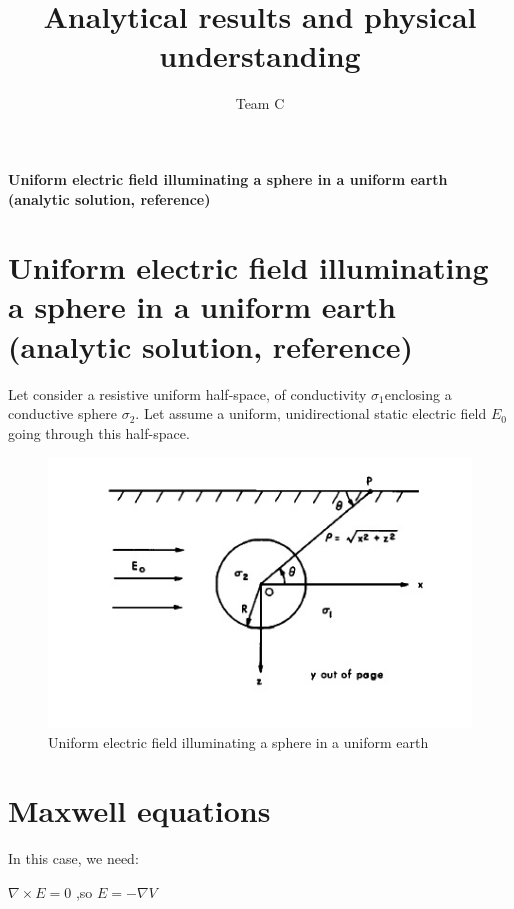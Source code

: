 \documentclass[11pt,letterpaper,leqno]{amsart}
\title{Analytical results and physical understanding}
\author{Team C}
\numberwithin{equation}{section}
\begin{document}
\maketitle
\thispagestyle{empty}



\Large
\textbf{Uniform electric field illuminating a sphere in a uniform earth (analytic solution, reference)}

\normalsize

\vspace{0.4cm}


\section{Uniform electric field illuminating a sphere in a uniform earth (analytic solution, reference)}



Let consider a  resistive uniform half-space, of conductivity $\sigma_1$enclosing a conductive sphere $\sigma_2$. Let assume a uniform, unidirectional static electric field $E_0$ going through this half-space.

\begin{figure}[h]
\caption{Uniform electric field illuminating a sphere in a uniform earth}
\includegraphics[scale=0.7]{ElectroStaticSphere.png}
\end{figure}

\section{Maxwell equations}

In this case, we need:

$\nabla \times E =0$ \quad,so \quad $E=-\nabla V$
\end{document}
